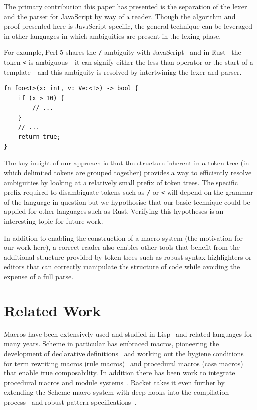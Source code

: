 \documentclass[preprint,10pt]{sigplanconf}
\begin{document}
The primary contribution this paper has presented is the separation of
the lexer and the parser for JavaScript by way of a reader. Though the
algorithm and proof presented here is JavaScript specific, the general
technique can be leveraged in other languages in which ambiguities are
present in the lexing phase.

For example, Perl 5 shares the \lstinline!/! ambiguity with
JavaScript~\cite{parsingperl} and in Rust~\cite{rustlang} the token
\lstinline!<! is ambiguous---it can signify either the less than operator
or the start of a template---and this ambiguity is resolved by
intertwining the lexer and parser.

\begin{lstlisting}
fn foo<T>(x: int, v: Vec<T>) -> bool {
    if (x > 10) {
        // ...
    }
    // ...
    return true;
}
\end{lstlisting}

The key insight of our approach is that the structure inherent in a
token tree (in which delimited tokens are grouped together) provides a
way to efficiently resolve ambiguities by looking at a relatively
small prefix of token trees. The specific prefix required to
disambiguate tokens such as \lstinline!/! or \lstinline!<! will depend
on the grammar of the language in question but we hypothosise that our
basic technique could be applied for other languages such as Rust.
Verifying this hypotheses is an interesting topic for future work.

In addition to enabling the construction of a macro system (the
motivation for our work here), a correct reader also enables other
tools that benefit from the additional structure provided by token
trees such as robust syntax highlighters or editors that can correctly
manipulate the structure of code while avoiding the expense of a full
parse.


\section{Related Work}
\label{sec:related}

Macros have been extensively used and studied in Lisp~\cite{Foderaro1983,Pitman1980} and related languages for many years. Scheme in particular has embraced macros, pioneering the development of declarative definitions~\cite{Kohlbecker1987} and working out the hygiene conditions for term rewriting macros (rule macros)~\cite{Clinger1991} and procedural macros (case macros)~\cite{Hieb1992} that enable true composability.
In addition there has been work to integrate procedural macros and module systems~\cite{Flatt2002,Ghuloum2007}.
Racket takes it even further by extending the Scheme macro system with deep hooks into the compilation process~\cite{Flatt2012,Tobin-Hochstadt2011} and robust pattern specifications~\cite{Culpepper2010a}.
\end{document}
